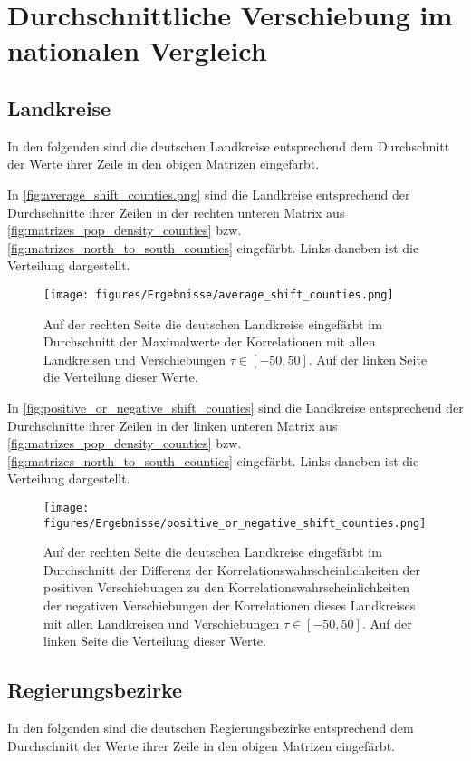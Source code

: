\section{Durchschnittliche Verschiebung im nationalen Vergleich}
\subsection{Landkreise}
In den folgenden sind die deutschen Landkreise entsprechend dem Durchschnitt der Werte ihrer Zeile in den obigen Matrizen eingefärbt.

In \autoref{fig:average_shift_counties.png} sind die Landkreise entsprechend der Durchschnitte ihrer Zeilen in der rechten unteren Matrix aus \autoref{fig:matrizes_pop_density_counties} bzw. \autoref{fig:matrizes_north_to_south_counties} eingefärbt. Links daneben ist die Verteilung dargestellt.

\begin{figure}[H]
    \centering
    \texttt{[image: figures/Ergebnisse/average\_shift\_counties.png]}
    \caption{Auf der rechten Seite die deutschen Landkreise eingefärbt im Durchschnitt der Maximalwerte der Korrelationen mit allen Landkreisen und Verschiebungen $\tau\in[-50,50]$. Auf der linken Seite die Verteilung dieser Werte.}
    \label{fig:average_shift_counties.png}
\end{figure}

In \autoref{fig:positive_or_negative_shift_counties} sind die Landkreise entsprechend der Durchschnitte ihrer Zeilen in der linken unteren Matrix aus \autoref{fig:matrizes_pop_density_counties} bzw. \autoref{fig:matrizes_north_to_south_counties} eingefärbt. Links daneben ist die Verteilung dargestellt.

\begin{figure}[H]
    \centering
    \texttt{[image: figures/Ergebnisse/positive\_or\_negative\_shift\_counties.png]}
    \caption{Auf der rechten Seite die deutschen Landkreise eingefärbt im Durchschnitt der Differenz der Korrelationswahrscheinlichkeiten der positiven Verschiebungen zu den Korrelationswahrscheinlichkeiten der negativen Verschiebungen der Korrelationen dieses Landkreises mit allen Landkreisen und Verschiebungen $\tau\in[-50,50]$. Auf der linken Seite die Verteilung dieser Werte.}
    \label{fig:positive_or_negative_shift_counties}
\end{figure}



\subsection{Regierungsbezirke}
In den folgenden sind die deutschen Regierungsbezirke entsprechend dem Durchschnitt der Werte ihrer Zeile in den obigen Matrizen eingefärbt.

